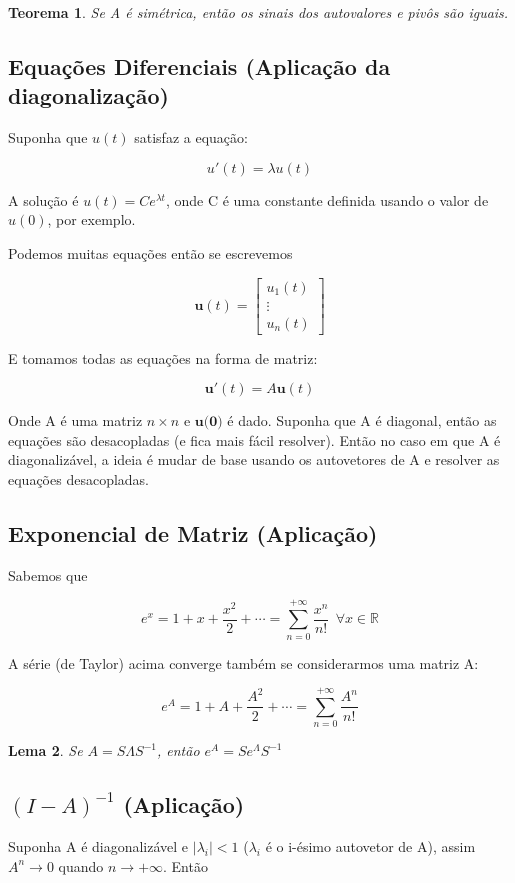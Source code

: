 \documentclass[12pt]{article}
\newtheorem{theorem}{Teorema}
\newtheorem{lemma}[theorem]{Lema}
\begin{document}
\begin{theorem}
Se A é simétrica, então os sinais dos autovalores e pivôs são iguais.
\end{theorem}

\subsection*{Equações Diferenciais (Aplicação da diagonalização)}
Suponha que $u(t)$ satisfaz a equação:

$$u'(t) = \lambda u(t)$$

A solução é $u(t) = C e^{\lambda t}$, onde C é uma constante definida usando o valor de $u(0)$, por exemplo.

Podemos muitas equações então se escrevemos

$$\textbf{u}(t) = \left[ \begin{array}{c}
    u_1(t) \\
    \vdots \\
    u_n(t)
\end{array} \right]$$

E tomamos todas as equações na forma de matriz:

$$\textbf{u}'(t) = A \textbf{u} (t)$$

Onde A é uma matriz $n \times n$ e $\textbf{u(0)}$ é dado. Suponha que A é diagonal, então as equações são desacopladas (e fica mais fácil resolver). Então no caso em que A é diagonalizável, a ideia é mudar de base usando os autovetores de A e resolver as equações desacopladas.

\subsection*{Exponencial de Matriz (Aplicação)}
Sabemos que

$$e^x = 1 + x + \dfrac{x^2}{2} + \cdots = \sum_{n = 0}^{+ \infty} \dfrac{x^n}{n!} \ \ \forall x \in \mathbb{R}$$

A série (de Taylor) acima converge também se considerarmos uma matriz A:

$$e^A = 1 + A + \dfrac{A^2}{2} + \cdots = \sum_{n = 0}^{+ \infty} \dfrac{A^n}{n!}$$

\begin{lemma}
    Se $A = S \Lambda S^{-1}$, então $e^A = S e^\Lambda S^{-1}$
\end{lemma}

\subsection*{$(I - A)^{-1}$ (Aplicação)}
Suponha A é diagonalizável  e $|\lambda_i| < 1$ ($\lambda_i$ é o i-ésimo autovetor de A), assim $A^n \rightarrow 0$ quando $n \rightarrow + \infty$. Então
\end{document}
